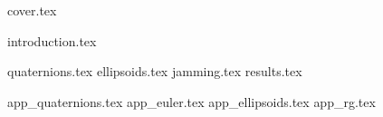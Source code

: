 \documentclass[a4paper]{report}
\begin{document}
{cover.tex}

\tableofcontents
\thispagestyle{empty}
\newpage
\setcounter{page}{1}

{introduction.tex}

{quaternions.tex}
{ellipsoids.tex}
{jamming.tex}
{results.tex}

\newpage
{}

{\renewcommand{\bibname}{References}}

\begin{appendices}

{app_quaternions.tex}
{app_euler.tex}
{app_ellipsoids.tex}
{app_rg.tex}

\end{appendices}
\end{document}

